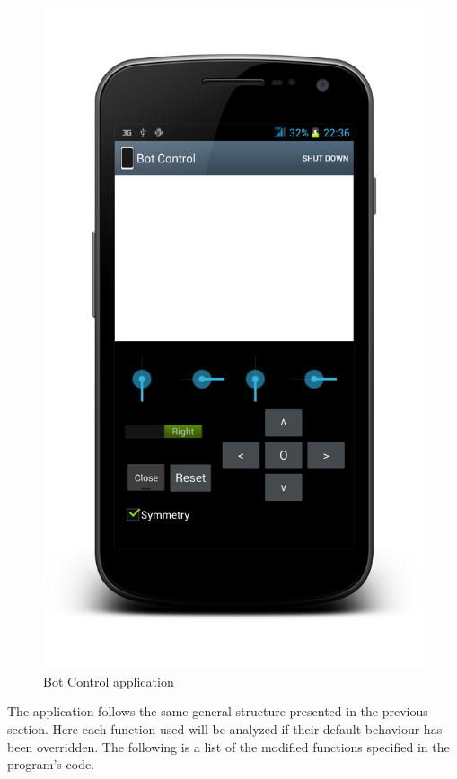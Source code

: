 	\begin{figure}[H]
      \centering
      \includegraphics[scale=.17]{images/Android/BotControl.png}
      \caption{Bot Control application }
      \label{BotControlApp}
  \end{figure}
  \bigskip


The application follows the same general structure presented in the previous section. Here each function used will be analyzed if their default behaviour has been overridden. The following is a list of the modified functions specified in the program's code.
 
